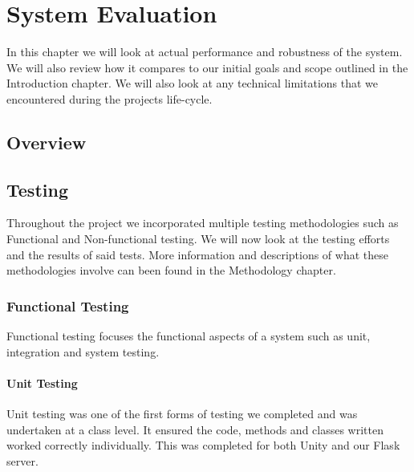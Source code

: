 \chapter{System Evaluation}
In this chapter we will look at actual performance and robustness of the system. We will also review how it compares to our initial goals and scope outlined in the Introduction chapter. We will also look at any technical limitations that we encountered during the projects life-cycle.

\section{Overview}

\section{Testing}
Throughout the project we incorporated multiple testing methodologies such as Functional and Non-functional testing. We will now look at the testing efforts and the results of said tests. More information and descriptions of what these methodologies involve can been found in the Methodology chapter.

\subsection{Functional Testing}
Functional testing focuses the functional aspects of a system such as unit, integration and system testing.

\subsubsection{Unit Testing}
Unit testing was one of the first forms of testing we completed and was undertaken at a class level. It ensured the code, methods and classes written worked correctly individually. This was completed for both Unity and our Flask server.

